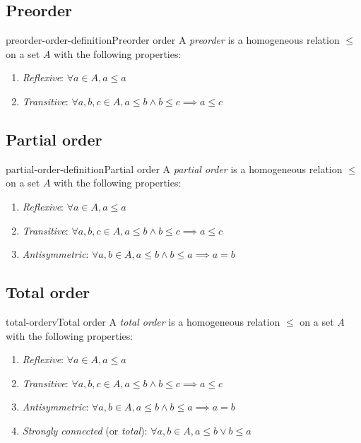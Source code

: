 \documentclass[preview]{standalone}
\begin{document}
\subsection{Preorder}

\begin{snippetdefinition}{preorder-order-definition}{Preorder order}
    A \textit{preorder} is a homogeneous relation \(\leq\) on a set \(A\)
    with the following properties:
    \begin{enumerate}
        \item \textit{Reflexive}: \(\forall a \in A, a \leq a\)
        \item \textit{Transitive}: \(\forall a,b,c \in A, a \leq b \land b \leq c \implies a \leq c\)
    \end{enumerate}
\end{snippetdefinition}

\subsection{Partial order}

\begin{snippetdefinition}{partial-order-definition}{Partial order}
    A \textit{partial order} is a homogeneous relation \(\leq\) on a set \(A\)
    with the following properties:
    \begin{enumerate}
        \item \textit{Reflexive}: \(\forall a \in A, a \leq a\)
        \item \textit{Transitive}: \(\forall a,b,c \in A, a \leq b \land b \leq c \implies a \leq c\)
        \item \textit{Antisymmetric}: \(\forall a,b \in A, a \leq b \land b \leq a \implies a=b\)
    \end{enumerate}
\end{snippetdefinition}

\subsection{Total order}

\begin{snippetdefinition}{total-orderv}{Total order}
    A \textit{total order} is a homogeneous relation \(\leq\) on a set \(A\)
    with the following properties:
    
    \begin{enumerate}
        \item \textit{Reflexive}: \(\forall a \in A, a \leq a\)
        \item \textit{Transitive}: \(\forall a,b,c \in A, a \leq b \land b \leq c \implies a \leq c\)
        \item \textit{Antisymmetric}: \(\forall a,b \in A, a \leq b \land b \leq a \implies a=b\)
        \item \textit{Strongly connected} (or \textit{total}): \(\forall a,b\in A, a \leq b \lor b\leq a\)
    \end{enumerate}
\end{snippetdefinition}
\end{document}
